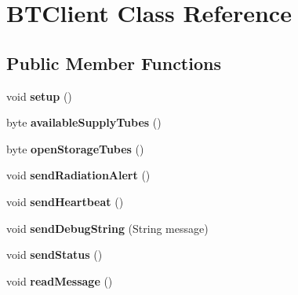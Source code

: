\hypertarget{classBTClient}{\section{B\-T\-Client Class Reference}
\label{classBTClient}
}
\subsection*{Public Member Functions}
\begin{DoxyCompactItemize}
\item 
\hypertarget{classBTClient_aefdc156fe1f22455d249ec0bb7fa3fd5}{void {\bfseries setup} ()}\label{classBTClient_aefdc156fe1f22455d249ec0bb7fa3fd5}

\item 
\hypertarget{classBTClient_a8305c35eac468b66f6e8cfe18b331e04}{byte {\bfseries available\-Supply\-Tubes} ()}\label{classBTClient_a8305c35eac468b66f6e8cfe18b331e04}

\item 
\hypertarget{classBTClient_a4c0882cd410b694e9f9406c6e2c58dc8}{byte {\bfseries open\-Storage\-Tubes} ()}\label{classBTClient_a4c0882cd410b694e9f9406c6e2c58dc8}

\item 
\hypertarget{classBTClient_a70cc30b8de8632bd6fb81972a9409a10}{void {\bfseries send\-Radiation\-Alert} ()}\label{classBTClient_a70cc30b8de8632bd6fb81972a9409a10}

\item 
\hypertarget{classBTClient_a4bf8f58f2c83834cab585e69c55c171f}{void {\bfseries send\-Heartbeat} ()}\label{classBTClient_a4bf8f58f2c83834cab585e69c55c171f}

\item 
\hypertarget{classBTClient_a57a82b64a1233a66450c1d9ebe48774c}{void {\bfseries send\-Debug\-String} (String message)}\label{classBTClient_a57a82b64a1233a66450c1d9ebe48774c}

\item 
\hypertarget{classBTClient_a8820e63eebe5ab16fac9b7cb522fc55a}{void {\bfseries send\-Status} ()}\label{classBTClient_a8820e63eebe5ab16fac9b7cb522fc55a}

\item 
\hypertarget{classBTClient_a8e827d16926d45a4b7c18dda0e59837b}{void {\bfseries read\-Message} ()}\label{classBTClient_a8e827d16926d45a4b7c18dda0e59837b}

\end{DoxyCompactItemize}

